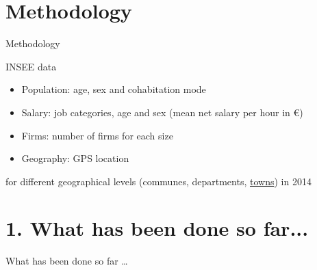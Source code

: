 \documentclass[xcolor=dvipsnames]{beamer}
\begin{document}
\section{Methodology}
		\begin{frame}{\vskip 0.05cm\centerline{\Huge\textcolor{bscuro}{Methodology}}}
		INSEE data
				\begin{itemize}
				\item Population: age, sex and cohabitation mode
				\item Salary: job categories, age and sex (mean net salary per hour in \euro)
				\item Firms: number of firms for each size
				\item Geography: GPS location
				\end{itemize}
		for different geographical levels (communes, departments, \underline{towns}) in 2014
\end{frame}
	
	
\section{1. What has been done so far...}
		\begin{frame}%
		\vskip 1.8cm \centerline{\Huge\textcolor{bscuro}{What has been done so far \ldots}}

\end{frame}
\end{document}
